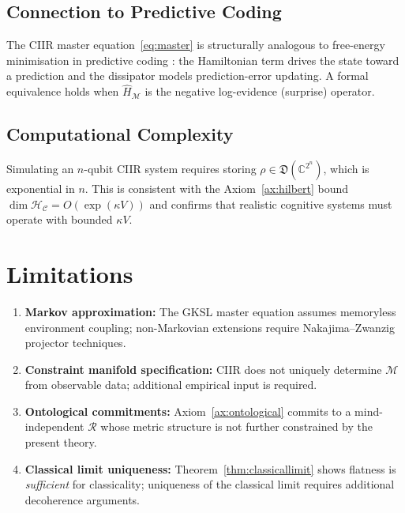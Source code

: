 \documentclass[twocolumn,aps,prd,superscriptaddress,nofootinbib]{revtex4-2}
\newcommand{\HC}{\mathcal{H}_{\mathcal{C}}}
\newcommand{\CR}{\mathcal{R}}
\newcommand{\CM}{\mathcal{M}}
\newcommand{\hatH}{\hat{H}}
\begin{document}
\subsection{Connection to Predictive Coding}

The CIIR master equation~\eqref{eq:master} is structurally analogous to
free-energy minimisation in predictive coding \cite{Friston2010}: the
Hamiltonian term drives the state toward a prediction and the dissipator
models prediction-error updating.  A formal equivalence holds when
$\hatH_\CM$ is the negative log-evidence (surprise) operator.

\subsection{Computational Complexity}

Simulating an $n$-qubit CIIR system requires storing $\rho \in \mathfrak{D}(\mathbb{C}^{2^n})$, which is exponential in $n$.  This is consistent with the Axiom~\ref{ax:hilbert} bound $\dim\HC = O(\exp(\kappa V))$ and confirms that realistic cognitive systems must operate with bounded $\kappa V$.

\section{Limitations}
\label{sec:limitations}

\begin{enumerate}
\item \textbf{Markov approximation:} The GKSL master equation assumes
      memoryless environment coupling; non-Markovian extensions require
      Nakajima--Zwanzig projector techniques.
\item \textbf{Constraint manifold specification:} CIIR does not uniquely
      determine $\CM$ from observable data; additional empirical input is
      required.
\item \textbf{Ontological commitments:} Axiom~\ref{ax:ontological} commits
      to a mind-independent $\CR$ whose metric structure is not further
      constrained by the present theory.
\item \textbf{Classical limit uniqueness:} Theorem~\ref{thm:classicallimit}
      shows flatness is \emph{sufficient} for classicality; uniqueness of
      the classical limit requires additional decoherence arguments.
\end{enumerate}
\end{document}
